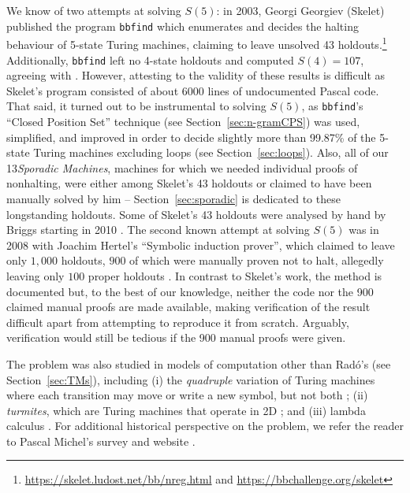 \documentclass[a4paper,british]{article}
\theoremstyle{definition} %
\numberwithin{equation}{section}
\theoremstyle{definition} %
\newcommand{\rado}{Rad\'o\xspace}
\newcommand{\numSporadic}{13\xspace}
\begin{document}
We know of two attempts at solving $S(5)$: in 2003, Georgi Georgiev (Skelet) published the program \texttt{bbfind} \cite{Skelet_bbfind} which enumerates and decides the halting behaviour of 5-state Turing machines, claiming to leave unsolved 43 holdouts.\footnote{\url{https://skelet.ludost.net/bb/nreg.html} and \url{https://bbchallenge.org/skelet}} Additionally, \texttt{bbfind} left no 4-state holdouts and computed $S(4) = 107$, agreeing with \cite{Brady83}. However, attesting to the validity of these results is difficult as Skelet's program consisted of about 6000 lines of undocumented Pascal code. That said, it turned out to be instrumental to solving $S(5)$, as \texttt{bbfind}'s ``Closed Position Set'' technique (see Section~\ref{sec:n-gramCPS}) was used, simplified, and improved in order to decide slightly more than 99.87\% of the 5-state Turing machines excluding loops (see Section~\ref{sec:loops}). Also, all of our \numSporadic \textit{Sporadic Machines}, \ie machines for which we needed individual proofs of nonhalting, were either among Skelet's 43 holdouts or claimed to have been manually solved by him -- Section~\ref{sec:sporadic} is dedicated to these longstanding holdouts. Some of Skelet's 43 holdouts were analysed by hand by Briggs starting in 2010 \cite{DanBriggs}. The second known attempt at solving $S(5)$ was in 2008 with Joachim Hertel's ``Symbolic induction prover'', which claimed to leave only $1{,}000$ holdouts, $900$ of which were manually proven not to halt, allegedly leaving only $100$ proper holdouts \cite{Hertel}. In contrast to Skelet's work, the method is documented but, to the best of our knowledge, neither the code nor the 900 claimed manual proofs are made available, making verification of the result difficult apart from attempting to reproduce it from scratch. Arguably, verification would still be tedious if the 900 manual proofs were given.

The \BBfull problem was also studied in models of computation other than \rado's (see Section~\ref{sec:TMs}), including (i) the \textit{quadruple} variation of Turing machines where each transition may move or write a new symbol, but not both \cite{Ross2003,Ross2005}; (ii) \textit{turmites}, which are Turing machines that operate in 2D \cite{BradyMeaningOfLife}; and (iii) lambda calculus \cite{tromp_oeis}. For additional historical perspective on the \BBfull problem, we refer the reader to Pascal Michel's survey and website \cite{michel2019busy,PMichel_website}.
\end{document}
